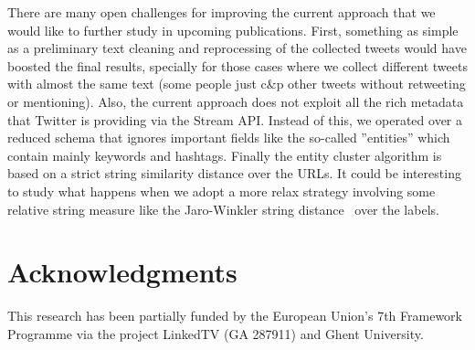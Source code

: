 \documentclass{sig-alternate}
\begin{document}
There are many open challenges for improving the current approach that we would like to further study in upcoming publications. First, something as simple as a preliminary text cleaning and reprocessing of the collected tweets would have boosted the final results, specially for those cases where we collect different tweets with almost the same text (some people just c\&p other tweets without retweeting or mentioning). Also, the current approach does not exploit all the rich metadata that Twitter is providing via the Stream API. Instead of this, we operated over a reduced schema that ignores important fields like the so-called ''entities'' which contain mainly keywords and hashtags. Finally the entity cluster algorithm is based on a strict string similarity distance over the URLs. It could be interesting to study what happens when we adopt a more relax strategy involving some relative string measure like the Jaro-Winkler string distance~\cite{winkler2006overview} over the labels. 

\section*{Acknowledgments}
This research has been partially funded by the European Union's 7th Framework Programme via the project LinkedTV (GA 287911) and Ghent University.



\end{document}
